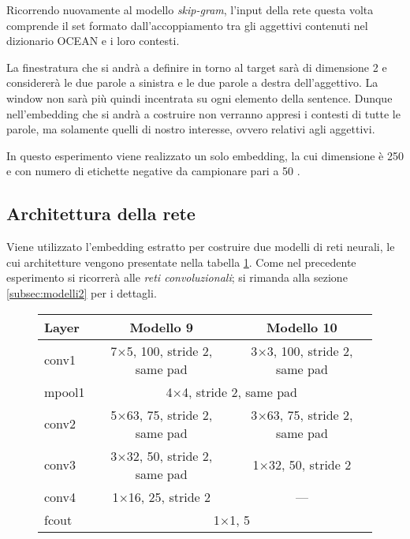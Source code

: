 Ricorrendo nuovamente al modello \emph{skip-gram}, l'input della rete questa volta comprende il set formato dall'accoppiamento tra gli aggettivi contenuti nel dizionario OCEAN e i loro contesti.

La finestratura che si andrà a definire in torno al target sarà di dimensione 2 e considererà le due parole a sinistra e le due parole a destra dell'aggettivo. La window non sarà più quindi incentrata su ogni elemento della sentence.
Dunque nell'embedding che si andrà a costruire non verranno appresi i contesti di tutte le parole, ma solamente quelli di nostro interesse, ovvero relativi agli aggettivi.

In questo esperimento viene realizzato un solo embedding, la cui dimensione è \num{250} e con numero di etichette negative da campionare pari a 50 \cite{liu2016classification}.

\subsection{Architettura della rete}
\label{subsec:modelli3}

Viene utilizzato l'embedding estratto per costruire due modelli di reti neurali, le cui architetture vengono presentate nella tabella \ref{tab:netemb3}.
Come nel precedente esperimento si ricorrerà alle \emph{reti convoluzionali}; si rimanda alla sezione \ref{subsec:modelli2} per i dettagli. 

\begin{figure}[H]
	\centering
	\begin{tabular}{lcc}
		\toprule
		\textbf{Layer}& \textbf{Modello 9} & \textbf{Modello 10}	\\ 
		\midrule
		conv1   & \num{7}$\times$\num{5}, 100, stride 2, same pad    		&\num{3}$\times$\num{3}, 100, stride 2, same pad 		   \\
		mpool1 	&\multicolumn{2}{c}{\num{4}$\times$\num{4}, stride 2, same pad}	 \\
		conv2  	&  \num{5}$\times$\num{63}, 75, stride 2, same pad	    &		\num{3}$\times$\num{63}, 75, stride 2, same pad    \\
		conv3  	& \num{3}$\times$\num{32}, 50, stride 2, same pad 	   	&	\num{1}$\times$\num{32}, 50, stride 2 	   \\
		conv4  	& \num{1}$\times$\num{16}, 25, stride 2 	   	&	--- 	   \\
		fcout	&\multicolumn{2}{c}{\num{1}$\times$\num{1}, 5}						\\
		
		\bottomrule	
	\end{tabular}
	\label{tab:netemb3}
\end{figure}

